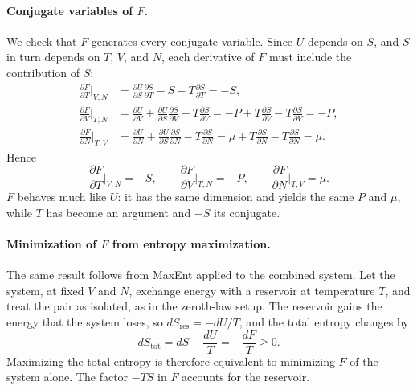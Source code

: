 \paragraph{Conjugate variables of $F$.}
We check that $F$ generates every conjugate variable. Since $U$ depends on
$S$, and $S$ in turn depends on $T$, $V$, and $N$, each derivative of $F$
must include the contribution of $S$:
\begin{align*}
    \frac{\partial F}{\partial T}\bigg|_{V,N}
    &=\frac{\partial U}{\partial S}\frac{\partial S}{\partial T}-S
    -T\frac{\partial S}{\partial T}=-S,\\
    \frac{\partial F}{\partial V}\bigg|_{T,N}
    &=\frac{\partial U}{\partial V}+\frac{\partial U}{\partial S}\frac{\partial S}{\partial V}
    -T\frac{\partial S}{\partial V}
    =-P+T\frac{\partial S}{\partial V}-T\frac{\partial S}{\partial V}=-P,\\
    \frac{\partial F}{\partial N}\bigg|_{T,V}
    &=\frac{\partial U}{\partial N}+\frac{\partial U}{\partial S}\frac{\partial S}{\partial N}
    -T\frac{\partial S}{\partial N}
    =\mu+T\frac{\partial S}{\partial N}-T\frac{\partial S}{\partial N}=\mu.
\end{align*}
Hence
\begin{equation}
    \boxed{\frac{\partial F}{\partial T}\bigg|_{V,N}=-S,\qquad
    \frac{\partial F}{\partial V}\bigg|_{T,N}=-P,\qquad
    \frac{\partial F}{\partial N}\bigg|_{T,V}=\mu.}
\end{equation}
$F$ behaves much like $U$: it has the same dimension and yields the same $P$
and $\mu$, while $T$ has become an argument and $-S$ its conjugate.

\paragraph{Minimization of $F$ from entropy maximization.}
The same result follows from MaxEnt applied to the combined system. Let the
system, at fixed $V$ and $N$, exchange energy with a reservoir at temperature
$T$, and treat the pair as isolated, as in the zeroth-law setup. The
reservoir gains the energy that the system loses, so
$dS_{\text{res}}=-dU/T$, and the total entropy changes by
\begin{equation}
    \boxed{dS_{\text{tot}}=dS-\frac{dU}{T}=-\frac{dF}{T}\geq0.}
\end{equation}
Maximizing the total entropy is therefore equivalent to minimizing $F$ of the
system alone. The factor $-TS$ in $F$ accounts for the reservoir.

